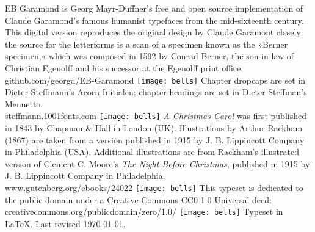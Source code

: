 \documentclass[
a5paper,
]{scrbook} %
\begin{document}
\centering
EB Garamond is Georg Mayr-Duffner's free and open source implementation of Claude Garamond’s famous humanist typefaces from the mid-sixteenth century. This digital version reproduces the original design by Claude Garamont closely: the source for the letterforms is a scan of a specimen known as the »Berner specimen,« which was composed in 1592 by Conrad Berner, the son-in-law of Christian Egenolff and his successor at the Egenolff print office.\\github.com/georgd/EB-Garamond
\vfill
\texttt{[image: bells]}
\vfill
Chapter dropcaps are set in Dieter Steffmann's Acorn Initialen; chapter headings are set in Dieter Steffman's Menuetto.\\steffmann.1001fonts.com
\vfill
\texttt{[image: bells]}
\vfill
\textit{A Christmas Carol} was first published in 1843 by Chapman \& Hall in London (UK). Illustrations by Arthur Rackham (1867) are taken from a version published in 1915 by J. B. Lippincott Company in Philadelphia (USA). Additional illustrations are from Rackham's illustrated version of Clement C. Moore's \textit{The Night Before Christmas}, published in 1915 by J. B. Lippincott Company in Philadelphia.\\www.gutenberg.org/ebooks/24022
\vfill
\texttt{[image: bells]}
\vfill
This typeset is dedicated to the public domain under a Creative Commons CC0 1.0 Universal deed: creativecommons.org/publicdomain/zero/1.0/
\vfill
\texttt{[image: bells]}
\vfill
Typeset in \LaTeX{}. Last revised \today.
\thispagestyle{empty}
\end{document}
